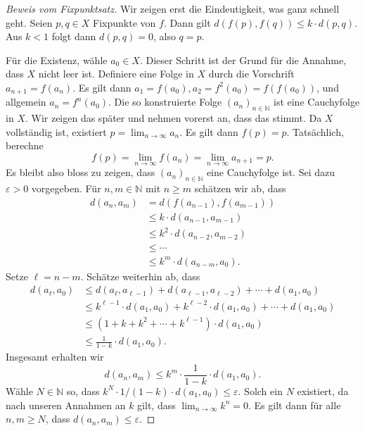 \documentclass[../main.tex]{subfiles}
\begin{document}
\begin{proof}[Beweis vom Fixpunktsatz]
  Wir zeigen erst die Eindeutigkeit,
  was ganz schnell geht.
  Seien $p, q \in X$ Fixpunkte von $f$.
  Dann gilt $d(f(p), f(q)) \leq k \cdot d(p, q)$.
  Aus $k < 1$ folgt dann $d(p, q) = 0$,
  also $q = p$.

  Für die Existenz, wähle $a_0 \in X$. Dieser
  Schritt ist der Grund für die Annahme,
  dass $X$ nicht leer ist.
  Definiere eine Folge in $X$ durch die
  Vorschrift $a_{n+1}= f(a_n)$.
  Es gilt dann $a_1 = f(a_0), a_2 = f^2(a_0) = f(f(a_0))$,
  und allgemein $a_n = f^n(a_0)$.
  Die so konstruierte Folge ${(a_{n})}_{n \in \mathbb{N}}$ 
  ist eine Cauchyfolge in $X$. Wir zeigen das später
  und nehmen vorerst an, dass das stimmt.
  Da $X$ vollständig ist, existiert $p = \lim_{n \to \infty} a_n$.
  Es gilt dann $f(p) = p$.
  Tatsächlich, berechne
  \[
  f(p) = \lim_{n \to \infty} f(a_n) = \lim_{n \to \infty}a_{n+1} = p.
  \]
  Es bleibt also bloss zu zeigen,
  dass $ {(a_n)}_{n \in \mathbb{N}}$
  eine Cauchyfolge ist.
  Sei dazu $\varepsilon > 0$ vorgegeben.
  Für $n, m \in \mathbb{N}$ mit $n \geq m$ 
  schätzen wir ab, dass
  \begin{align*}
    d(a_n, a_m)
    & = d(f(a_{n-1}), f(a_{m-1}))\\
    & \leq k \cdot d(a_{n-1}, a_{m-1}) \\
    &\leq k^2 \cdot d(a_{n-2}, a_{m-2})\\
    &\leq \cdots \\
    &\leq k^m \cdot d(a_{n-m}, a_0).
  \end{align*}
  Setze $\ell = n -m $.
  Schätze weiterhin ab, dass
  \begin{align*}
    d(a_{\ell}, a_0) 
    &\leq d(a_\ell, a_{\ell - 1})
    + d(a_{\ell - 1}, a_{\ell-2}) + \cdots + d(a_1, a_0)\\
    &\leq k^{\ell-1} \cdot d(a_{1}, a_{0})
    + k^{\ell - 2} \cdot d(a_1, a_0)
    + \cdots
    + d(a_1, a_0) \\
    &\leq (1 + k + k^2 + \cdots + k^{\ell-1})
    \cdot d(a_1, a_0) \\
    &\leq \frac{1}{1-k} \cdot d(a_1, a_0).
  \end{align*}
  Insgesamt erhalten wir
  \[
    d(a_n, a_m) \leq k^m \cdot \frac{1}{1-k} \cdot d(a_1, a_0).
  \]
  Wähle $N \in \mathbb{N}$ so,
  dass $k^N \cdot 1/(1-k) \cdot d(a_1, a_0) \leq \varepsilon$.
  Solch ein $N$ existiert, da 
  nach unseren Annahmen an $k$ gilt,
  dass $\lim_{n \to \infty} k^n = 0$.
  Es gilt dann für alle $n, m \geq N$, dass
  $d(a_n, a_m) \leq \varepsilon$.
\end{proof}
\end{document}

